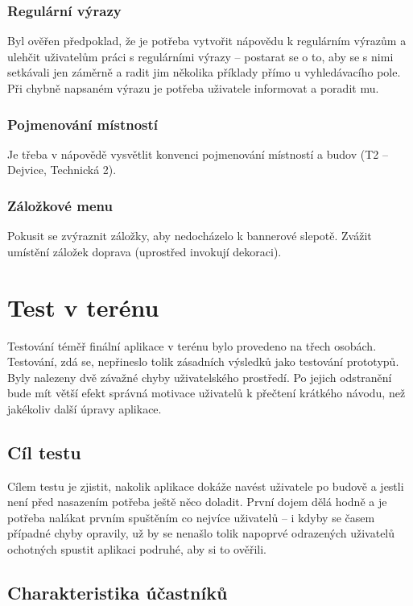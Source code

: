 \subsubsection*{Regulární výrazy}
Byl ověřen předpoklad, že je potřeba vytvořit nápovědu k regulárním výrazům a ulehčit uživatelům práci s regulárními výrazy -- postarat se o to, aby se s nimi setkávali jen záměrně a radit jim několika příklady přímo u vyhledávacího pole. Při chybně napsaném výrazu je potřeba uživatele informovat a poradit mu.
\subsubsection*{Pojmenování místností}
Je třeba v nápovědě vysvětlit konvenci pojmenování místností a budov (T2 -- Dejvice, Technická 2).
\subsubsection*{Záložkové menu}
Pokusit se zvýraznit záložky, aby nedocházelo k bannerové slepotě. Zvážit umístění záložek doprava (uprostřed invokují dekoraci).



\section{Test v terénu}
\label{sec:testVTerenu}
Testování téměř finální aplikace v terénu bylo provedeno na třech osobách. Testování, zdá se, nepřineslo tolik zásadních výsledků jako testování prototypů. Byly nalezeny dvě závažné chyby uživatelského prostředí. Po jejich odstranění bude mít větší efekt správná motivace uživatelů k přečtení krátkého návodu, než jakékoliv další úpravy aplikace.

\subsection{Cíl testu}
Cílem testu je zjistit, nakolik aplikace dokáže navést uživatele po budově a jestli není před nasazením potřeba ještě něco doladit. První dojem dělá hodně a je potřeba nalákat prvním spuštěním co nejvíce uživatelů -- i kdyby se časem případné chyby opravily, už by se nenašlo tolik napoprvé odrazených uživatelů ochotných spustit aplikaci podruhé, aby si to ověřili. 



\subsection{Charakteristika účastníků}

